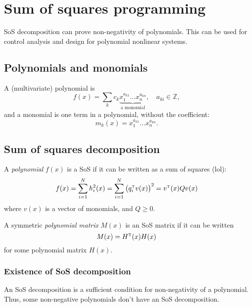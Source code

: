\section{Sum of squares programming}
SoS decomposition can prove non-negativity of polynomials. This can be used for control analysis and design for polynomial nonlinear systems.

\subsection{Polynomials and monomials}
A (multivariate) polynomial is
%
\begin{equation}
  f(x) = \sum_k c_k
  \underbrace{x_1^{a_{k1}} \dots x_n^{a_{kn}}}_{\text{a monomial}},\quad a_{ki} \in \mathbb{Z},
\end{equation}
%
and a monomial is one term in a polynomial, without the coefficient:
%
\begin{equation}
  m_k(x) = x_1^{a_{k1}} \dots x_n^{a_{kn}}.
\end{equation}

\subsection{Sum of squares decomposition}
A \emph{polynomial} $f(x)$ is a SoS if it can be written as a sum of squares (lol):
%
\begin{equation}\label{eq:sos-decomp}
  f(x) =
  \sum_{i=1}^N h_i^2(x) =
  \sum_{i=1}^N \left(q_i\tp v(x)\right)^2 =
  v\tp(x) Q v(x)
\end{equation}
%
where $v(x)$ is a vector of monomials, and $Q \geq 0$.

A symmetric \emph{polynomial matrix} $M(x)$ is an SoS matrix if it can be written
%
\begin{equation}
  M(x) = H\tp(x) H(x)
\end{equation}
%
for some polynomial matrix $H(x)$.

\subsubsection{Existence of SoS decomposition}
An SoS decomposition is a sufficient condition for non-negativity of a polynomial. Thus, some non-negative polynomials don't have an SoS decomposition.

